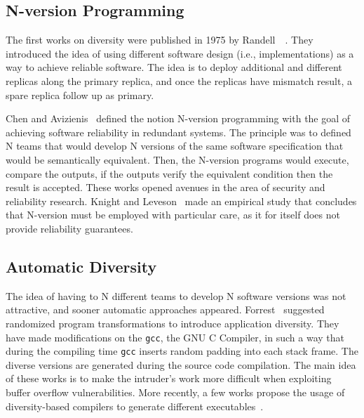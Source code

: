 \subsection{N-version Programming}
The first works on diversity were published in 1975 by Randell~\etal{}~\cite{Randell:1975}. 
They introduced the idea of using different software design (i.e., implementations) as a way to achieve reliable software. 
The idea is to deploy additional and different replicas along the primary replica, and once the replicas have mismatch result, a spare replica follow up as primary.


Chen and Avizienis~\cite{Avizienis:1977,Chen:1978} defined the notion N-version programming with the goal of achieving software reliability in redundant systems.
The principle was to defined N teams that would develop N versions of the same software specification that would be semantically equivalent.
Then, the N-version programs would execute, compare the outputs, if the outputs verify the equivalent condition then the result is accepted.
These works opened avenues in the area of security and reliability research.
Knight and Leveson~\cite{Knight:1986} made an empirical study that concludes that N-version must be employed with particular care, as it for itself does not provide reliability guarantees. 

\subsection{Automatic Diversity}  
The idea of having to N different teams to develop N software versions was not attractive, and sooner automatic approaches appeared.
Forrest~\cite{Forrest:1997} suggested randomized program transformations to introduce application diversity. 
They have made modifications on the \texttt{gcc}, the GNU C Compiler, in such a way that during the compiling time \texttt{gcc} inserts random padding
into each stack frame. 
The diverse versions are generated during the source code compilation. 
The main idea of these works is to make the intruder’s work more difficult when exploiting buffer overflow vulnerabilities.
More recently, a few works propose the usage of diversity-based compilers to generate different executables~\cite{Platania:2014,Roeder:2010,King:2016}.


